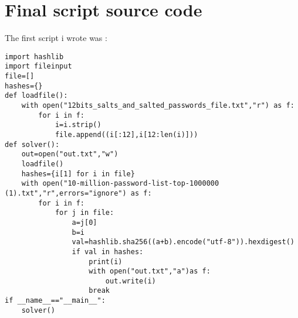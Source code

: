 \documentclass{article}
\begin{document}
\section{Final script source code}
The first script i wrote was :\\
\begin{verbatim}
import hashlib
import fileinput
file=[]
hashes={}
def loadfile():
    with open("12bits_salts_and_salted_passwords_file.txt","r") as f:
        for i in f:
            i=i.strip()
            file.append((i[:12],i[12:len(i)]))
def solver():
    out=open("out.txt","w")
    loadfile()
    hashes={i[1] for i in file}
    with open("10-million-password-list-top-1000000 (1).txt","r",errors="ignore") as f:
        for i in f:
            for j in file:
                a=j[0]
                b=i
                val=hashlib.sha256((a+b).encode("utf-8")).hexdigest()
                if val in hashes:
                    print(i)
                    with open("out.txt","a")as f:
                        out.write(i)
                    break
if __name__=="__main__":
    solver()
\end{verbatim}
\end{document}
